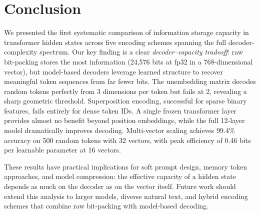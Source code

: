 \section{Conclusion}
\label{sec:conclusion}

We presented the first systematic comparison of information storage capacity in transformer hidden states across five encoding schemes spanning the full decoder-complexity spectrum. Our key finding is a clear \emph{decoder--capacity tradeoff}: raw bit-packing stores the most information (24,576 bits at fp32 in a 768-dimensional vector), but model-based decoders leverage learned structure to recover meaningful token sequences from far fewer bits. The unembedding matrix decodes random tokens perfectly from 3 dimensions per token but fails at 2, revealing a sharp geometric threshold. Superposition encoding, successful for sparse binary features, fails entirely for dense token IDs. A single frozen transformer layer provides almost no benefit beyond position embeddings, while the full 12-layer model dramatically improves decoding. Multi-vector scaling achieves 99.4\% accuracy on 500 random tokens with 32 vectors, with peak efficiency of 0.46 bits per learnable parameter at 16 vectors.

These results have practical implications for soft prompt design, memory token approaches, and model compression: the effective capacity of a hidden state depends as much on the decoder as on the vector itself. Future work should extend this analysis to larger models, diverse natural text, and hybrid encoding schemes that combine raw bit-packing with model-based decoding.
